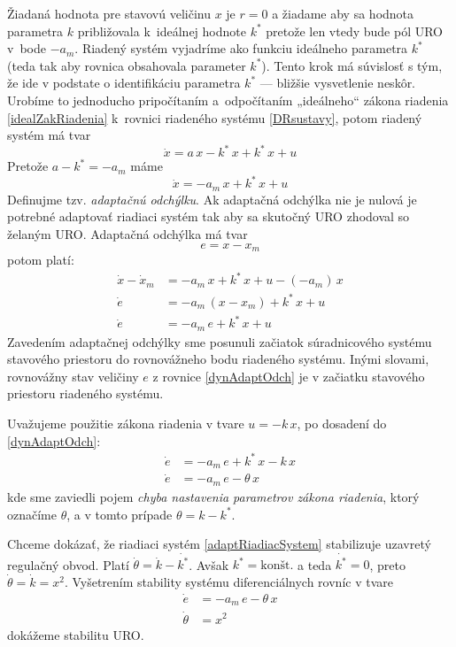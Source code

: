\documentclass[a4paper, 10pt, ]{article}
\begin{document}
Žiadaná hodnota pre stavovú veličinu $x$ je $r = 0$ a žiadame aby sa hodnota parametra $k$ približovala k~ideálnej hodnote $k^*$ pretože len vtedy bude pól URO v~bode $-a_m$. Riadený systém vyjadríme ako funkciu ideálneho parametra $k^*$ (teda tak aby rovnica obsahovala parameter $k^*$). Tento krok má súvislosť s tým, že ide v podstate o identifikáciu parametra $k^*$ --- bližšie vysvetlenie neskôr.  Urobíme to jednoducho pripočítaním a~odpočítaním „ideálneho“ zákona riadenia \eqref{idealZakRiadenia} k~rovnici riadeného systému \eqref{DRsustavy}, potom riadený systém má tvar
\begin{equation}
	\dot{x} = a\, x - k^*\, x + k^*\, x + u
\end{equation}
Pretože $a - k^* = -a_m$ máme
\begin{equation}
	\dot{x} = -a_m\, x + k^*\, x + u
\end{equation}
Definujme tzv. \emph{adaptačnú odchýlku}. Ak adaptačná odchýlka nie je nulová je potrebné adaptovať riadiaci systém tak aby sa skutočný URO zhodoval so želaným URO. Adaptačná odchýlka má tvar
\begin{equation}
	e = x - x_m
\end{equation}
potom platí:
\begin{subequations}
	\begin{align}
		\dot{x} - \dot{x}_m &= -a_m\, x + k^*\, x + u - (-a_m)\, x  \\
		\dot{e} &= -a_m\,(x - x_m) + k^*\, x + u \\
		\dot{e} &= -a_m\,e + k^*\, x + u   \label{dynAdaptOdch}
	\end{align}
\end{subequations}
Zavedením adaptačnej odchýlky sme posunuli začiatok súradnicového systému stavového priestoru do rovnovážneho bodu riadeného systému. Inými slovami, rovnovážny stav veličiny $e$ z rovnice \eqref{dynAdaptOdch} je v začiatku stavového priestoru riadeného systému.

Uvažujeme použitie zákona riadenia v tvare $u = -k\, x$, po dosadení do \eqref{dynAdaptOdch}:
\begin{align}
	\dot{e} &= -a_m\,e + k^*\, x  -k\, x \\
	\dot{e} &= -a_m\,e - \theta\, x
\end{align}
kde sme zaviedli pojem \emph{chyba nastavenia parametrov zákona riadenia}, ktorý označíme $\theta$, a v tomto prípade $\theta = k - k^*$.

Chceme dokázať, že riadiaci systém \eqref{adaptRiadiacSystem} stabilizuje uzavretý regulačný obvod. Platí $\dot{\theta} = \dot{k} - \dot{k^*}$. Avšak $k^* = \text{konšt.}$ a teda $\dot{k^*} = 0$, preto $\dot{\theta} = \dot{k} = x^2$. Vyšetrením stability systému diferenciálnych rovníc v tvare
\begin{subequations} \label{dynamikaAdaptOdch}
	\begin{align}
		\dot{e} &= -a_m\,e - \theta\, x  \\
		\dot{\theta} &= x^2
	\end{align}
\end{subequations}
dokážeme stabilitu URO.
\end{document}
